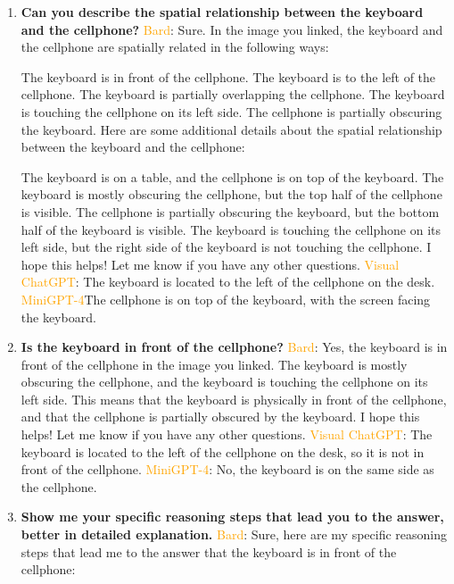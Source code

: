     \begin{enumerate}
        \item \textbf{Can you describe the spatial relationship between the keyboard and the cellphone?}
        \subitem \textcolor{orange}{Bard}: 
        Sure. In the image you linked, the keyboard and the cellphone are spatially related in the following ways:
        
        The keyboard is in front of the cellphone.
        The keyboard is to the left of the cellphone.
        The keyboard is partially overlapping the cellphone.
        The keyboard is touching the cellphone on its left side.
        The cellphone is partially obscuring the keyboard.
        Here are some additional details about the spatial relationship between the keyboard and the cellphone:
        
        The keyboard is on a table, and the cellphone is on top of the keyboard.
        The keyboard is mostly obscuring the cellphone, but the top half of the cellphone is visible.
        The cellphone is partially obscuring the keyboard, but the bottom half of the keyboard is visible.
        The keyboard is touching the cellphone on its left side, but the right side of the keyboard is not touching the cellphone.
        I hope this helps! Let me know if you have any other questions.
        \subitem \textcolor{orange}{Visual ChatGPT}: The keyboard is located to the left of the cellphone on the desk.
        \subitem \textcolor{orange}{MiniGPT-4}The cellphone is on top of the keyboard, with the screen facing the keyboard.
        \item \textbf{Is the keyboard in front of the cellphone?}
        \subitem \textcolor{orange}{Bard}: Yes, the keyboard is in front of the cellphone in the image you linked. The keyboard is mostly obscuring the cellphone, and the keyboard is touching the cellphone on its left side. This means that the keyboard is physically in front of the cellphone, and that the cellphone is partially obscured by the keyboard. I hope this helps! Let me know if you have any other questions.
        \subitem \textcolor{orange}{Visual ChatGPT}: The keyboard is located to the left of the cellphone on the desk, so it is not in front of the cellphone.
        \subitem \textcolor{orange}{MiniGPT-4}: No, the keyboard is on the same side as the cellphone.
        \item \textbf{Show me your specific reasoning steps that lead you to the answer, better in detailed explanation.}
        \subitem \textcolor{orange}{Bard}: Sure, here are my specific reasoning steps that lead me to the answer that the keyboard is in front of the cellphone:


\end{enumerate}
